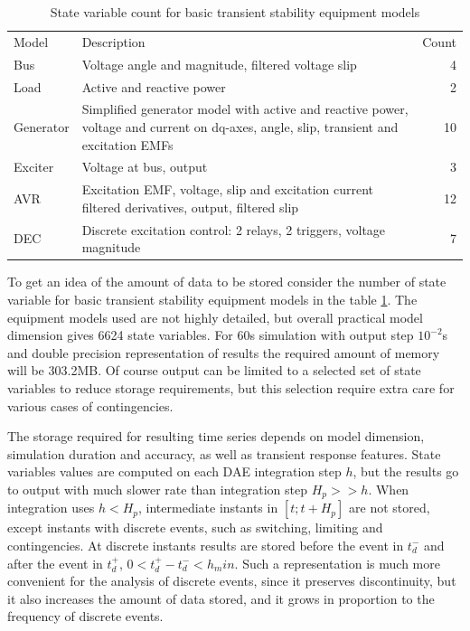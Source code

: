 \documentclass[lettersize,journal]{IEEEtran}
\begin{document}
\begin{table}[!h]
	\caption{State variable count for basic transient stability equipment models\label{tab:statvarscount}}
	\centering
	\begin{tabularx}{\columnwidth}{l|X|r}
		\hline
		Model & Description & Count\\
		\hlineB{3}	
		Bus & Voltage angle and magnitude, filtered voltage slip & 4\\
		\hline
		Load & Active and reactive power & 2\\
		\hline
		Generator & Simplified generator model with active and reactive power, voltage and current on dq-axes, 
		angle, slip, transient and excitation EMFs & 10\\
		\hline
		Exciter & Voltage at bus, output & 3\\
		\hline
		AVR & Excitation EMF, voltage, slip and excitation current filtered derivatives, output, filtered slip & 12\\
		\hline
		DEC & Discrete excitation control: 2 relays, 2 triggers, voltage magnitude & 7\\
		\hline
	\end{tabularx}
\end{table}

To get an idea of the amount of data to be stored consider the number of state variable for basic transient 
stability equipment models in the table \ref{tab:statvarscount}. The equipment models used are not 
highly detailed, but overall practical model dimension gives 6624 state variables. For 60s simulation with
output step \(10^{-2}\)s and double precision representation of results the required amount of memory will be 303.2MB.
Of course output can be limited to a selected set of state variables to reduce storage requirements,
but this selection require extra care for various cases of contingencies.

The storage required for resulting time series depends on model dimension, simulation duration
and accuracy, as well as transient response features. State variables values are computed on each DAE integration
step \(h\), but the results go to output with much slower rate than integration step \(H_p>>h\). 
When integration uses \(h<H_p\), intermediate instants in \([t;t+H_p]\) are not stored, except
instants with discrete events, such as switching, limiting and contingencies. At discrete instants
results are stored before the event in \(t_d^-\) and after the event in \(t_d^+\), \(0<t_d^+-t_d^-<h_min\).
Such a representation is much more convenient for the analysis of discrete events, since it preserves
discontinuity, but it also increases the amount of data stored, and it grows in proportion to the 
frequency of discrete events.
\end{document}
